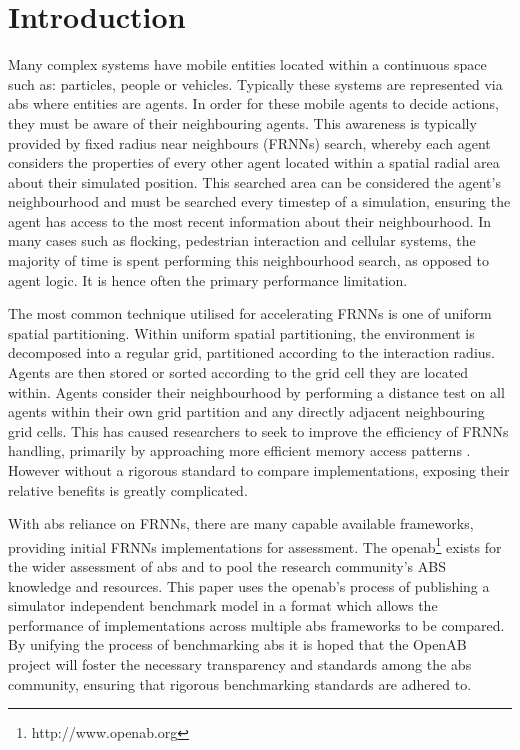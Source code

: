 \section{Introduction}
  Many complex systems have mobile entities located within a continuous space such as: particles, people or vehicles. Typically these systems are represented via \gls{abs} where entities are agents. In order for these mobile agents to decide actions, they must be aware of their neighbouring agents. This awareness is typically provided by fixed radius near neighbours (FRNNs) search, whereby each agent considers the properties of every other agent located within a spatial radial area about their simulated position. This searched area can be considered the agent's neighbourhood and must be searched every timestep of a simulation, ensuring the agent has access to the most recent information about their neighbourhood. In many cases such as flocking, pedestrian interaction and cellular systems, the majority of time is spent performing this neighbourhood search, as opposed to agent logic. It is hence often the primary performance limitation.
  
  The most common technique utilised for accelerating FRNNs is one of uniform spatial partitioning. Within uniform spatial partitioning, the environment is decomposed into a regular grid, partitioned according to the interaction radius. Agents are then stored or sorted according to the grid cell they are located within. Agents consider their neighbourhood by performing a distance test on all agents within their own grid partition and any directly adjacent neighbouring grid cells. This has caused researchers to seek to improve the efficiency of FRNNs handling, primarily by approaching more efficient memory access patterns \cite{GS*10,Hoe14,HY*15}. However without a rigorous standard to compare implementations, exposing their relative benefits is greatly complicated.
  
  With \gls{abs} reliance on FRNNs, there are many capable available frameworks, providing initial FRNNs implementations for assessment. The \gls{openab}\footnote{http://www.openab.org} exists for the wider assessment of \gls{abs} and to pool the research community's ABS knowledge and resources. This paper uses the \gls{openab}'s process of publishing a simulator independent benchmark model in a format which allows the performance of implementations across multiple \gls{abs} frameworks to be compared. By unifying the process of benchmarking \gls{abs} it is hoped that the OpenAB project will foster the necessary transparency and standards among the \gls{abs} community, ensuring that rigorous benchmarking standards are adhered to.
  
